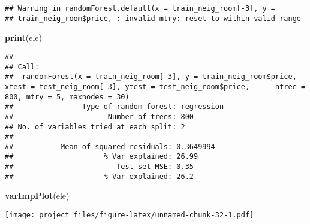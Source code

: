 \documentclass[
]{article}
\newenvironment{Shaded}{\begin{snugshade}}{\end{snugshade}}
\newcommand{\CommentTok}[1]{\textcolor[rgb]{0.56,0.35,0.01}{\textit{#1}}}
\newcommand{\DataTypeTok}[1]{\textcolor[rgb]{0.13,0.29,0.53}{#1}}
\newcommand{\DecValTok}[1]{\textcolor[rgb]{0.00,0.00,0.81}{#1}}
\newcommand{\KeywordTok}[1]{\textcolor[rgb]{0.13,0.29,0.53}{\textbf{#1}}}
\newcommand{\NormalTok}[1]{#1}
\newcommand{\OperatorTok}[1]{\textcolor[rgb]{0.81,0.36,0.00}{\textbf{#1}}}
\newcommand{\StringTok}[1]{\textcolor[rgb]{0.31,0.60,0.02}{#1}}
\begin{document}
\begin{Shaded}
\end{Shaded}

\begin{verbatim}
## Warning in randomForest.default(x = train_neig_room[-3], y =
## train_neig_room$price, : invalid mtry: reset to within valid range
\end{verbatim}

\begin{Shaded}
\begin{Highlighting}[]
\KeywordTok{print}\NormalTok{(ele)}
\end{Highlighting}
\end{Shaded}

\begin{verbatim}
## 
## Call:
##  randomForest(x = train_neig_room[-3], y = train_neig_room$price,      xtest = test_neig_room[-3], ytest = test_neig_room$price,      ntree = 800, mtry = 5, maxnodes = 30) 
##                Type of random forest: regression
##                      Number of trees: 800
## No. of variables tried at each split: 2
## 
##           Mean of squared residuals: 0.3649994
##                     % Var explained: 26.99
##                        Test set MSE: 0.35
##                     % Var explained: 26.2
\end{verbatim}

\begin{Shaded}
\begin{Highlighting}[]
\KeywordTok{varImpPlot}\NormalTok{(ele)}
\end{Highlighting}
\end{Shaded}

\texttt{[image: project\_files/figure-latex/unnamed-chunk-32-1.pdf]}
\end{document}
